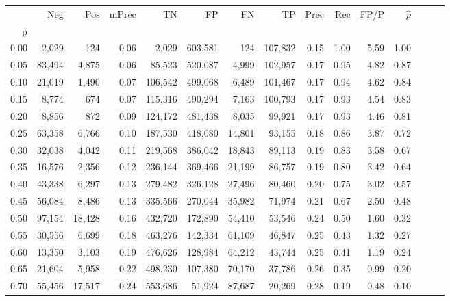 \begin{tabular}{rrrrrrrrrrrrrrr}
\toprule
{} &     Neg &     Pos & mPrec &       TN &       FP &       FN &       TP &  Prec &   Rec &  FP/P & $\hat{p}$ \\
p    &         &         &       &          &          &          &          &       &       &       &           \\
\midrule
0.00 &   2,029 &     124 &  0.06 &    2,029 &  603,581 &      124 &  107,832 &  0.15 &  1.00 &  5.59 &      1.00 \\
0.05 &  83,494 &   4,875 &  0.06 &   85,523 &  520,087 &    4,999 &  102,957 &  0.17 &  0.95 &  4.82 &      0.87 \\
0.10 &  21,019 &   1,490 &  0.07 &  106,542 &  499,068 &    6,489 &  101,467 &  0.17 &  0.94 &  4.62 &      0.84 \\
0.15 &   8,774 &     674 &  0.07 &  115,316 &  490,294 &    7,163 &  100,793 &  0.17 &  0.93 &  4.54 &      0.83 \\
0.20 &   8,856 &     872 &  0.09 &  124,172 &  481,438 &    8,035 &   99,921 &  0.17 &  0.93 &  4.46 &      0.81 \\
0.25 &  63,358 &   6,766 &  0.10 &  187,530 &  418,080 &   14,801 &   93,155 &  0.18 &  0.86 &  3.87 &      0.72 \\
0.30 &  32,038 &   4,042 &  0.11 &  219,568 &  386,042 &   18,843 &   89,113 &  0.19 &  0.83 &  3.58 &      0.67 \\
0.35 &  16,576 &   2,356 &  0.12 &  236,144 &  369,466 &   21,199 &   86,757 &  0.19 &  0.80 &  3.42 &      0.64 \\
0.40 &  43,338 &   6,297 &  0.13 &  279,482 &  326,128 &   27,496 &   80,460 &  0.20 &  0.75 &  3.02 &      0.57 \\
0.45 &  56,084 &   8,486 &  0.13 &  335,566 &  270,044 &   35,982 &   71,974 &  0.21 &  0.67 &  2.50 &      0.48 \\
0.50 &  97,154 &  18,428 &  0.16 &  432,720 &  172,890 &   54,410 &   53,546 &  0.24 &  0.50 &  1.60 &      0.32 \\
0.55 &  30,556 &   6,699 &  0.18 &  463,276 &  142,334 &   61,109 &   46,847 &  0.25 &  0.43 &  1.32 &      0.27 \\
0.60 &  13,350 &   3,103 &  0.19 &  476,626 &  128,984 &   64,212 &   43,744 &  0.25 &  0.41 &  1.19 &      0.24 \\
0.65 &  21,604 &   5,958 &  0.22 &  498,230 &  107,380 &   70,170 &   37,786 &  0.26 &  0.35 &  0.99 &      0.20 \\
0.70 &  55,456 &  17,517 &  0.24 &  553,686 &   51,924 &   87,687 &   20,269 &  0.28 &  0.19 &  0.48 &      0.10 \\

\end{tabular}
